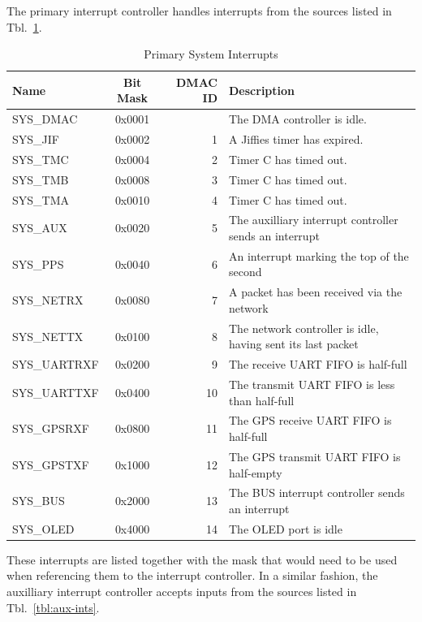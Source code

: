\documentclass{gqtekspec}
\begin{document}
The primary interrupt controller handles interrupts from the sources listed
in Tbl.~\ref{tbl:sys-ints}. 
\begin{table}[htbp]
\begin{center}\begin{tabular}{|p{1.0in}|c|r|p{3.00in}|}\hline
\rowcolor[gray]{0.85} Name & Bit Mask & DMAC ID &Description \\\hline\hline
SYS\_DMAC   & 0x0001 && The DMA controller is idle.\\\hline
SYS\_JIF    & 0x0002 & 1 & A Jiffies timer has expired.\\\hline
SYS\_TMC    & 0x0004 & 2 & Timer C has timed out.\\\hline
SYS\_TMB    & 0x0008 & 3 & Timer C has timed out.\\\hline
SYS\_TMA    & 0x0010 & 4 & Timer C has timed out.\\\hline
SYS\_AUX    & 0x0020 & 5 & The auxilliary interrupt controller sends an interrupt\\\hline
SYS\_PPS    & 0x0040 & 6 & An interrupt marking the top of the second\\\hline
SYS\_NETRX  & 0x0080 & 7 & A packet has been received via the network\\\hline
SYS\_NETTX  & 0x0100 & 8 & The network controller is idle, having sent its
			last packet\\\hline
SYS\_UARTRXF & 0x0200 &  9 & The receive UART FIFO is half-full\\\hline
SYS\_UARTTXF & 0x0400 & 10 & The transmit UART FIFO is less than half-full\\\hline
SYS\_GPSRXF  & 0x0800 & 11 & The GPS receive UART FIFO is half-full\\\hline
SYS\_GPSTXF  & 0x1000 & 12 & The GPS transmit UART FIFO is half-empty\\\hline
SYS\_BUS    & 0x2000 & 13 & The BUS interrupt controller sends an interrupt\\\hline
SYS\_OLED   & 0x4000 & 14 & The OLED port is idle\\\hline
\end{tabular}
\caption{Primary System Interrupts}\label{tbl:sys-ints}
\end{center}\end{table}
These interrupts are listed together with the
mask that would need to be used when referencing them to the interrupt
controller.  In a similar fashion, the auxilliary interrupt controller accepts
inputs from the sources listed in Tbl.~\ref{tbl:aux-ints}.  
\end{document}
